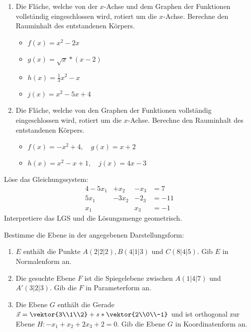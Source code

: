 \begin{enumerate}
  \item Die Fläche, welche von der $x$-Achse und dem Graphen der Funktionen vollständig eingeschlossen wird, rotiert um die $x$-Achse.
  Berechne den Rauminhalt des entstandenen Körpers.
  \begin{itemize}
    \item $f(x)=x^2-2x$
    \item $g(x)=\sqrt{x}*(x-2)$
    \item $h(x)=\frac 1 3 x^2-x$
    \item $j(x)=x^2-5x+4$
  \end{itemize}
  \item Die Fläche, welche von den Graphen der Funktionen vollständig eingeschlossen wird, rotiert um die $x$-Achse.
  Berechne den Rauminhalt des entstandenen Körpers.
  \begin{itemize}
    \item $f(x)= -x^2+4, \quad g(x)= x+2$
    \item $h(x)= x^2-x+1, \quad j(x)= 4x-3$
  \end{itemize}
\end{enumerate}

Löse das Gleichungssystem:
\begin{alignat*}{4}
	-5x_1& +x_2& -x_3& = 7\\
	5x_1&  -3x_2& -2_3& = -11\\
	x_1& & x_3& =-1
\end{alignat*}
Interpretiere das LGS und die Lösungsmenge geometrisch.

Bestimme die Ebene in der angegebenen Darstellungsform:
\begin{enumerate}
	\item $E$ enthält die Punkte $A(2|2|2), B(4|1|3)$ und $C(8|4|5)$. Gib $E$ in Normalenform an. %
	\item Die gesuchte Ebene $F$ ist die Spiegelebene zwischen $A(1|4|7)$ und $A'(3|2|3)$. Gib die $F$ in Parameterform an. %
	\item Die Ebene $G$ enthält die Gerade $\vec x = \vektor{3\\1\\2}+s*\vektor{2\\0\\-1}$ und ist orthogonal zur Ebene $H:-x_1+x_2+2x_3+2=0$. Gib die Ebene $G$ in Koordinatenform an. %
\end{enumerate}


